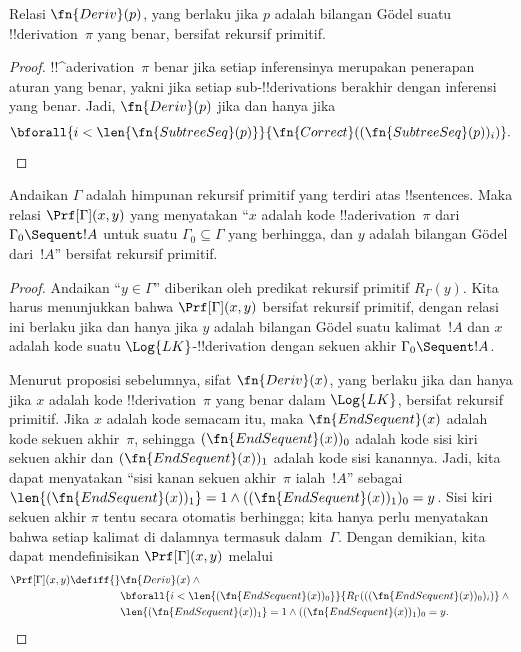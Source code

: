 \documentclass[../../../include/open-logic-section]{subfiles}
\begin{document}
\begin{prop}
  Relasi $\fn{Deriv}(p)$, yang berlaku jika $p$ adalah bilangan G\"odel suatu
  !!{derivation}~$\pi$ yang benar, bersifat rekursif primitif.
\end{prop}

\begin{proof}
  !!^a{derivation}~$\pi$ benar jika setiap inferensinya merupakan penerapan
  aturan yang benar, yakni jika setiap sub-!!{derivation}s berakhir dengan
  inferensi yang benar. Jadi, $\fn{Deriv}(p)$ jika dan hanya jika
  \[
  \bforall{i<\len{\fn{SubtreeSeq}(p)}}{\fn{Correct}((\fn{SubtreeSeq}(p))_i)}.
  \]
\end{proof}


\begin{prop}
Andaikan $\Gamma$ adalah himpunan rekursif primitif yang terdiri atas
!!{sentence}s. Maka relasi $\Prf[\Gamma](x, y)$ yang menyatakan ``$x$ adalah
kode !!a{derivation}~$\pi$ dari $\Gamma_0 \Sequent !A$ untuk suatu
$\Gamma_0 \subseteq \Gamma$ yang berhingga, dan $y$ adalah bilangan G\"odel
dari~$!A$'' bersifat rekursif primitif.
\end{prop}

\begin{proof}
Andaikan ``$y \in \Gamma$'' diberikan oleh predikat rekursif primitif
$R_\Gamma(y)$. Kita harus menunjukkan bahwa $\Prf[\Gamma](x, y)$ bersifat
rekursif primitif, dengan relasi ini berlaku jika dan hanya jika $y$ adalah
bilangan G\"odel suatu kalimat~$!A$ dan $x$ adalah kode suatu
$\Log{LK}$-!!{derivation} dengan sekuen akhir $\Gamma_0 \Sequent !A$.

Menurut proposisi sebelumnya, sifat $\fn{Deriv}(x)$, yang berlaku jika dan
hanya jika $x$ adalah kode !!{derivation}~$\pi$ yang benar dalam $\Log{LK}$,
bersifat rekursif primitif. Jika $x$ adalah kode semacam itu, maka
$\fn{EndSequent}(x)$ adalah kode sekuen akhir~$\pi$, sehingga
$(\fn{EndSequent}(x))_0$ adalah kode sisi kiri sekuen akhir dan
$(\fn{EndSequent}(x))_1$ adalah kode sisi kanannya. Jadi, kita dapat menyatakan
``sisi kanan sekuen akhir~$\pi$ ialah~$!A$'' sebagai
$\len{(\fn{EndSequent}(x))_1} = 1 \land ((\fn{EndSequent}(x))_1)_0 = y$.
Sisi kiri sekuen akhir $\pi$ tentu secara otomatis berhingga; kita hanya perlu
menyatakan bahwa setiap kalimat di dalamnya termasuk dalam~$\Gamma$. Dengan
demikian, kita dapat mendefinisikan $\Prf[\Gamma](x, y)$ melalui
\begin{align*}
\Prf[\Gamma](x, y) \defiff {}&
\fn{Deriv}(x) \land {} \\
& \bforall{i <
  \len{(\fn{EndSequent}(x))_0}}{R_\Gamma(((\fn{EndSequent}(x))_0)_i)} \land {}\\
& \len{(\fn{EndSequent}(x))_1} = 1 \land ((\fn{EndSequent}(x))_1)_0 = y.
\end{align*}
\end{proof}
\end{document}
